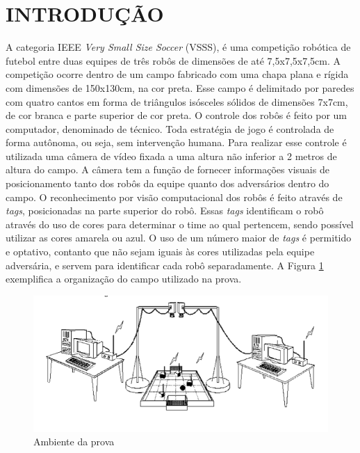 \section{INTRODUÇÃO}

A categoria IEEE \textit{Very Small Size Soccer} (VSSS), é uma competição robótica de futebol entre duas equipes de três robôs de dimensões de até 7,5x7,5x7,5cm. 
A competição ocorre dentro de um campo fabricado com uma chapa plana e rígida com dimensões de 150x130cm, na cor preta. Esse campo é delimitado por paredes com quatro cantos em forma de triângulos isósceles sólidos de dimensões 7x7cm, de cor branca e parte superior de cor preta. 
O controle dos robôs é feito por um computador, denominado de técnico. Toda estratégia de jogo é controlada de forma autônoma, ou seja, sem intervenção humana. 
Para realizar esse controle é utilizada uma câmera de vídeo fixada a uma altura não inferior a 2 metros de altura do campo. 
A câmera tem a função de fornecer informações visuais de posicionamento tanto dos robôs da equipe quanto dos adversários dentro do campo.
O reconhecimento por visão computacional dos robôs é feito através de \textit{tags}, posicionadas na parte superior do robô. Essas \textit{tags} identificam o robô através do uso de cores para determinar o time ao qual pertencem, sendo possível utilizar as cores amarela ou azul. O uso de um número maior de \textit{tags} é permitido e optativo, contanto que não sejam iguais às cores utilizadas pela equipe adversária, e servem para identificar cada robô separadamente. A Figura \ref{fig:esquematico} exemplifica a organização do campo utilizado na prova.

\begin{figure}[htbp]
\centerline{\includegraphics[width=\columnwidth]{capitulos/imagens/Esquematico-de-uma-partida-do-IEEE-VSSS.png}}
\caption{Ambiente da prova}
\label{fig:esquematico}
\end{figure}


